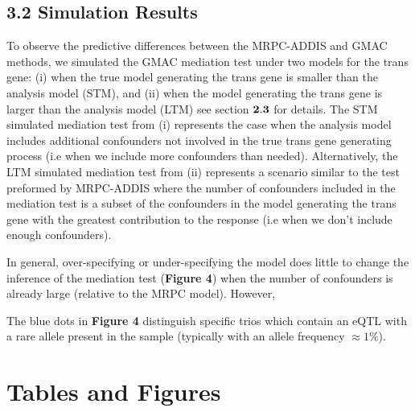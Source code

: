 \documentclass[
]{article}
\begin{document}
\subsection*{3.2 Simulation Results}

To observe the predictive differences between the MRPC-ADDIS and GMAC
methods, we simulated the GMAC mediation test under two models for the
trans gene: (i) when the true model generating the trans gene is smaller
than the analysis model (STM), and (ii) when the model generating the
trans gene is larger than the analysis model (LTM) see section
\({\bf 2.3}\) for details. The STM simulated mediation test from (i)
represents the case when the analysis model includes additional
confounders not involved in the true trans gene generating process (i.e
when we include more confounders than needed). Alternatively, the LTM
simulated mediation test from (ii) represents a scenario similar to the
test preformed by MRPC-ADDIS where the number of confounders included in
the mediation test is a subset of the confounders in the model
generating the trans gene with the greatest contribution to the response
(i.e when we don't include enough confounders).

In general, over-specifying or under-specifying the model does little to
change the inference of the mediation test (\textbf{Figure 4}) when the
number of confounders is already large (relative to the MRPC model).
However,

The blue dots in \textbf{Figure 4} distinguish specific trios which
contain an eQTL with a rare allele present in the sample (typically with
an allele frequency \(\approx 1\%\)).

\newpage
\section{Tables and Figures}
\end{document}
